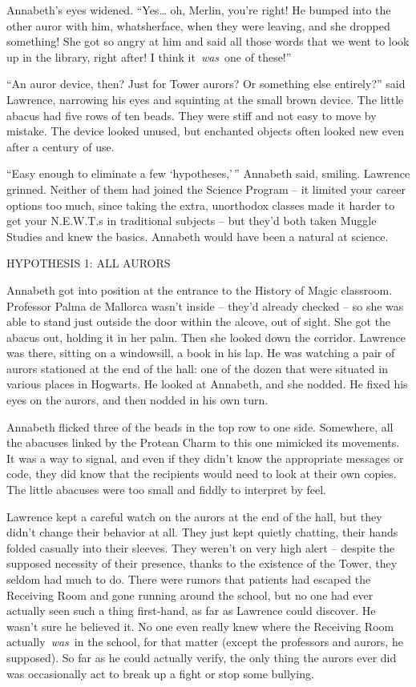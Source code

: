 Annabeth's eyes widened. ``Yes\ldots{} oh, Merlin, you're right! He
bumped into the other auror with him, whatsherface, when they were
leaving, and she dropped something! She got so angry at him and said all
those words that we went to look up in the library, right after! I think
it~\emph{was}~one of these!''

``An auror device, then? Just for Tower aurors? Or something else
entirely?'' said Lawrence, narrowing his eyes and squinting at the small
brown device. The little abacus had five rows of ten beads. They were
stiff and not easy to move by mistake. The device looked unused, but
enchanted objects often looked new even after a century of use.

``Easy enough to eliminate a few `hypotheses,'\,'' Annabeth said,
smiling. Lawrence grinned. Neither of them had joined the Science
Program -- it limited your career options too much, since taking the
extra, unorthodox classes made it harder to get your N.E.W.T.s in
traditional subjects -- but they'd both taken Muggle Studies and knew
the basics. Annabeth would have been a natural at science.

\mybreak

HYPOTHESIS 1: ALL AURORS

Annabeth got into position at the entrance to the History of Magic
classroom. Professor Palma de Mallorca wasn't inside -- they'd already
checked -- so she was able to stand just outside the door within the
alcove, out of sight. She got the abacus out, holding it in her palm.
Then she looked down the corridor. Lawrence was there, sitting on a
windowsill, a book in his lap. He was watching a pair of aurors
stationed at the end of the hall: one of the dozen that were situated in
various places in Hogwarts. He looked at Annabeth, and she nodded. He
fixed his eyes on the aurors, and then nodded in his own turn.

Annabeth flicked three of the beads in the top row to one side.
Somewhere, all the abacuses linked by the Protean Charm to this one
mimicked its movements. It was a way to signal, and even if they didn't
know the appropriate messages or code, they did know that the recipients
would need to look at their own copies. The little abacuses were too
small and fiddly to interpret by feel.

Lawrence kept a careful watch on the aurors at the end of the hall, but
they didn't change their behavior at all. They just kept quietly
chatting, their hands folded casually into their sleeves. They weren't
on very high alert -- despite the supposed necessity of their presence,
thanks to the existence of the Tower, they seldom had much to do. There
were rumors that patients had escaped the Receiving Room and gone
running around the school, but no one had ever actually seen such a
thing first-hand, as far as Lawrence could discover. He wasn't sure he
believed it. No one even really knew where the Receiving Room
actually~\emph{was}~in the school, for that matter (except the
professors and aurors, he supposed). So far as he could actually verify,
the only thing the aurors ever did was occasionally act to break up a
fight or stop some bullying.

